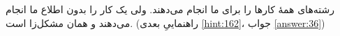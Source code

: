 \section{}
\paragraph{}\label{hint:72}
رشته‌های  همهٔ کارها را برای ما انجام می‌دهند. ولی یک کار را بدون اطلاع ما انجام می‌دهند و همان مشکل‌زا است. (راهنماییِ بعدی \ref{hint:162}، جواب \ref{answer:36})